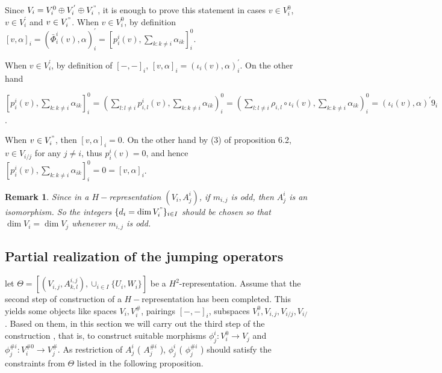 \def\CTEXPreproc{Created by ctex v0.2.12, don't edit!}\documentclass[11pt]{article}
\newtheorem{rem}{Remark}[section]
\begin{document}
\begin{pf} Since $V_i = V^0 _i \oplus V^{'}_i \oplus V^{"}_i $, it is enough to prove this statement in cases $v \in V^0 _i$, $v \in V^{'}_i $ and $v \in V^{"}_i $.   When $v \in V^0 _i $, by definition
$[ v, \alpha   ]_i = ( \bar{\Phi}^i _i (v) , \alpha    )^{'}_i =[ p^i _i (v) , \sum_{k:k\neq i} \alpha_{ik}  ]^0 _i $.

When $v\in V^{'}_i  $, by definition of $[-,-]_i$,
$[v, \alpha   ]_i = ( \iota_i (v) , \alpha  )^{'} _i $. On the other hand

\noindent $[ p^i _i (v) , \sum_{k:k\neq i} \alpha_{ik}    ]^0 _i = ( \sum_{l:l\neq i} p^{i}_{i,l}(v), \sum_{k:k\neq i}\alpha_{ik}  )^0 _i
= ( \sum_{l:l\neq i} \rho_{i,l}\circ \iota_i (v) , \sum_{k:k\neq i} \alpha_{ik}    )^0 _{i} = ( \iota_i (v) , \alpha  )^{'} 9_i  $.

When $v\in V^{"}_i $, then $[ v, \alpha  ]_i =0 $. On the other hand by (3) of proposition 6.2,  $v\in V_{i/j}$ for any $j\neq i$, thus $p^i _i (v)=0$, and hence  $[ p^i _i (v) , \sum_{k:k\neq i} \alpha_{ik}    ]^0 _i =0=[ v, \alpha  ]_i $.

\end{pf}

\begin{rem}  Since in a $H-$representation $( V_i , A^i _j )$, if $m_{i,j}$ is odd, then $A^i _j$ is an isomorphism. So the integers
 $\{ d_i = \dim V^{"}_i \}_{i\in I}$ should be chosen so that $\dim V_i = \dim V_j$ whenever $m_{i,j}$ is odd.


\end{rem}





\subsection{Partial realization of the jumping operators}

let $\Theta = [ ( V_{i,j} , A^{i,j}_{k,l} ) ,  \cup_{i\in I} \{ U_i ,W_i \}    ] $ be a $H^2$-representation. Assume that the second step  of construction of a $H-$representation has been completed. This yields some objects like spaces $V_i , V^{\#}_i$, pairings $[-,-]_i$, subspaces $V^0 _i ,  V_{i,j} , V_{i/j} , V_{i/}$. Based on them, in this section we will carry out the third step  of the construction , that is, to construct suitable morphisms $\phi^i _j : V^0 _i \rightarrow V_j $ and $\phi^{\# i }_j : V^{\# 0}_i \rightarrow V^{\#}_j $.
As restriction of $A^i _j$ ( $ A^{\# i}_j $  ), $\phi^i _j $ ( $ \phi^{\# i} _j $  ) should satisfy the constraints from $\Theta$ listed in the following proposition.
\end{document}
